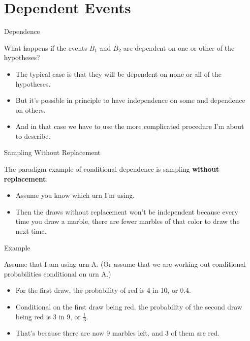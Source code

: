 \documentclass[
  ignorenonframetext,
]{beamer}
\providecommand{\tightlist}{%
  \setlength{\itemsep}{0pt}\setlength{\parskip}{0pt}}
\renewcommand{\,}{\text{, }}
\begin{document}
\hypertarget{dependent-events}{%
\section{Dependent Events}\label{dependent-events}}

\begin{frame}{Dependence}
\protect\hypertarget{dependence}{}

What happens if the events \(B_1\) and \(B_2\) are dependent on one or
other of the hypotheses?

\begin{itemize}
\tightlist
\item
  The typical case is that they will be dependent on none or all of the
  hypotheses.
\item
  But it's possible in principle to have independence on some and
  dependence on others.
\item
  And in that case we have to use the more complicated procedure I'm
  about to describe.
\end{itemize}

\end{frame}

\begin{frame}{Sampling Without Replacement}
\protect\hypertarget{sampling-without-replacement}{}

The paradigm example of conditional dependence is sampling
\textbf{without replacement}.

\begin{itemize}
\tightlist
\item
  Assume you know which urn I'm using.
\item
  Then the draws without replacement won't be independent because every
  time you draw a marble, there are fewer marbles of that color to draw
  the next time.
\end{itemize}

\end{frame}

\begin{frame}{Example}
\protect\hypertarget{example}{}

Assume that I am using urn A. (Or assume that we are working out
conditional probabilities conditional on urn A.)

\begin{itemize}
\tightlist
\item
  For the first draw, the probability of red is 4 in 10, or 0.4.
\item
  Conditional on the first draw being red, the probability of the second
  draw being red is 3 in 9, or \(\frac{1}{3}\).
\item
  That's because there are now 9 marbles left, and 3 of them are red.
\end{itemize}

\end{frame}
\end{document}
